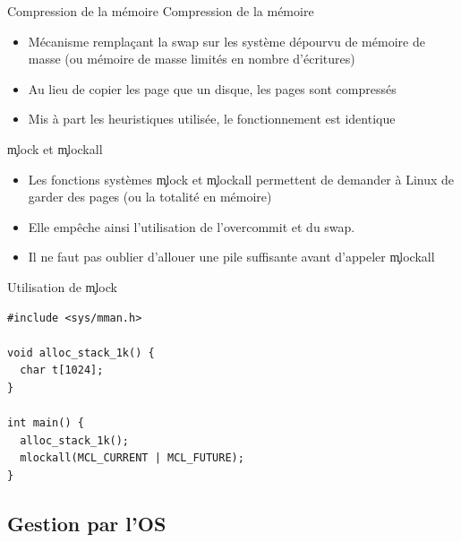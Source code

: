 \begin{frame}[fragile=singleslide]{Compression de la mémoire}
  Compression de la mémoire
  \begin{itemize}
  \item  Mécanisme remplaçant  la  swap sur  les  système dépourvu  de
    mémoire  de   masse  (ou  mémoire  de  masse   limités  en  nombre
    d'écritures)
  \item  Au lieu  de copier  les page  que un  disque, les  pages sont
    compressés
  \item Mis  à part les  heuristiques utilisée, le  fonctionnement est
    identique
  \end{itemize}
\end{frame}

\begin{frame}[fragile=singleslide]{\c{mlock}                     et
  \c{mlockall}}
  \begin{itemize}
  \item Les  fonctions systèmes \c{mlock}  et \c{mlockall}
    permettent  de  demander  à  Linux  de garder  des  pages  (ou  la
    totalité en mémoire)
  \item Elle empêche ainsi l'utilisation de l'overcommit et du swap.
  \item  Il ne  faut pas  oublier d'allouer  une pile  suffisante avant
    d'appeler \c{mlockall}
  \end{itemize}
\end{frame}

\begin{frame}[fragile]{Utilisation de \c{mlock}}
\begin{lstlisting}
#include <sys/mman.h>

void alloc_stack_1k() {
  char t[1024];
}

int main() {
  alloc_stack_1k();
  mlockall(MCL_CURRENT | MCL_FUTURE);
}
\end{lstlisting}
\end{frame}

\subsection{Gestion par l'OS}

